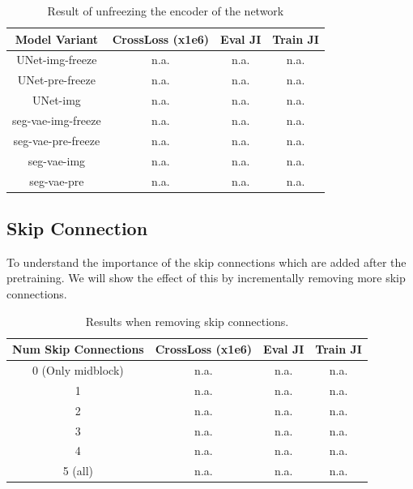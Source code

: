 \begin{table}[!ht]
    \centering
    \caption{Result of unfreezing the encoder of the network}
    \label{tab:abl-freeze-enc}
    \begin{tabular}{cccc}
        \hline
        Model Variant      & CrossLoss (x1e6) & Eval JI & Train JI \\
        \hline
        UNet-img-freeze    & n.a.             & n.a.    & n.a.     \\
        UNet-pre-freeze    & n.a.             & n.a.    & n.a.     \\
        UNet-img           & n.a.             & n.a.    & n.a.     \\
        seg-vae-img-freeze & n.a.             & n.a.    & n.a.     \\
        seg-vae-pre-freeze & n.a.             & n.a.    & n.a.     \\
        seg-vae-img        & n.a.             & n.a.    & n.a.     \\
        seg-vae-pre        & n.a.             & n.a.    & n.a.     \\
        \hline
    \end{tabular}
\end{table}

\subsection{Skip Connection}
To understand the importance of the skip connections which are added after the pretraining. We will show the effect of this by incrementally removing more skip connections.

\begin{table}[!ht]
    \centering
    \caption{Results when removing skip connections.}
    \label{tab:abl-skip-connection}
    \begin{tabular}{cccc}
        \hline
        Num Skip Connections & CrossLoss (x1e6) & Eval JI & Train JI \\
        \hline
        0 (Only midblock)    & n.a.             & n.a.    & n.a.     \\
        1                    & n.a.             & n.a.    & n.a.     \\
        2                    & n.a.             & n.a.    & n.a.     \\
        3                    & n.a.             & n.a.    & n.a.     \\
        4                    & n.a.             & n.a.    & n.a.     \\
        5 (all)              & n.a.             & n.a.    & n.a.     \\
        \hline
    \end{tabular}
\end{table}

